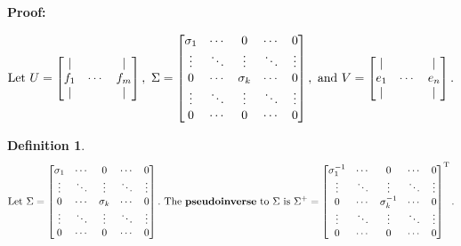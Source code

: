 \documentclass{article}
\theoremstyle{colontheorem}
\newtheorem{definition}[theorem]{Definition}
\newenvironment{Def}
{
	\begin{mdframed}[backgroundcolor=DefGreen!10]
	\begin{definition}
}
{
	\end{definition}
	\end{mdframed}
	
	\vspace{.15in}
}
\newenvironment{Proof}
{
	\vspace{-.3in}
	
	\begin{mdframed}[backgroundcolor=ProofPurple!10]
	\textbf{Proof:}%
}
{
	\end{mdframed}
	
	\vspace{.15in}
}
\begin{document}
\begin{Proof}
	$$
		\textnormal{Let}\ U = \begin{bmatrix}
			| & & |\\
			f_1 & \cdots & f_m\\
			| & & |
		\end{bmatrix},\ \Sigma = \begin{bmatrix}
			\sigma_1 & \cdots & 0 & \cdots & 0\\
			\vdots & \ddots & \vdots & \ddots & \vdots\\
			0 & \cdots & \sigma_k & \cdots & 0\\
			\vdots & \ddots & \vdots & \ddots & \vdots\\
			0 & \cdots & 0 & \cdots & 0
		\end{bmatrix},\ \textnormal{and}\ V = \begin{bmatrix}
			| & & |\\
			e_1 & \cdots & e_n\\
			| & & |
		\end{bmatrix}.
	$$
	
\end{Proof}



\begin{Def}
	
	$$
		\textnormal{Let}\ \Sigma = \begin{bmatrix}
			\sigma_1 & \cdots & 0 & \cdots & 0\\
			\vdots & \ddots & \vdots & \ddots & \vdots\\
			0 & \cdots & \sigma_k & \cdots & 0\\
			\vdots & \ddots & \vdots & \ddots & \vdots\\
			0 & \cdots & 0 & \cdots & 0
		\end{bmatrix}.\ \textnormal{The \textbf{pseudoinverse} to}\ \Sigma\ \textnormal{is}\ \Sigma^+ = \begin{bmatrix}
			\sigma_1^{-1} & \cdots & 0 & \cdots & 0\\
			\vdots & \ddots & \vdots & \ddots & \vdots\\
			0 & \cdots & \sigma_k^{-1} & \cdots & 0\\
			\vdots & \ddots & \vdots & \ddots & \vdots\\
			0 & \cdots & 0 & \cdots & 0
		\end{bmatrix}^\textnormal{T}.
	$$
	
\end{Def}
\end{document}
